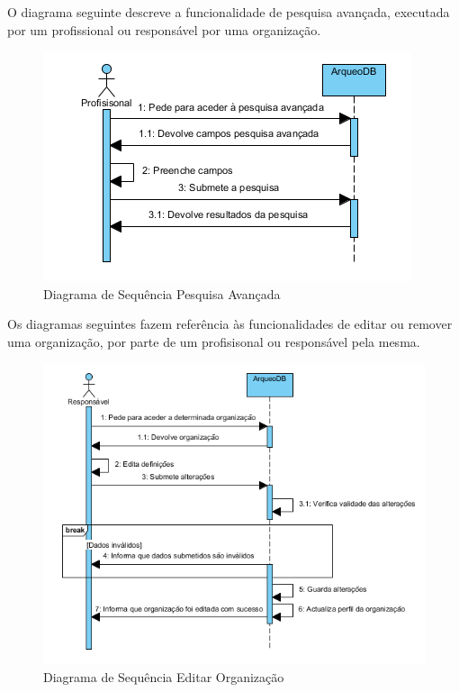 ﻿\documentclass[12pt,a4paper]{article}
\begin{document}
\clearpage
\clearpage
O diagrama seguinte descreve a funcionalidade de pesquisa avançada, executada por um profissional ou responsável por uma organização.\\

\begin{figure}[h!]
\centering
\includegraphics[scale=1]{sequencia/pesquisaavancada}
\caption{Diagrama de Sequência Pesquisa Avançada} 
\end{figure} 

Os diagramas seguintes fazem referência às funcionalidades de editar ou remover uma organização, por parte de um profisisonal ou responsável pela mesma.\\

\begin{figure}[h!]
\centering
\includegraphics[scale=1]{sequencia/editarorganizacao}
\caption{Diagrama de Sequência Editar Organização} 
\end{figure}  
\end{document}
